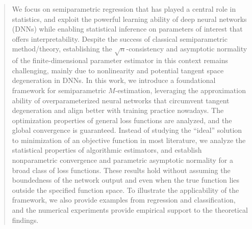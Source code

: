 \begin{abstract} 

We focus on semiparametric regression that has played a central role in statistics, and exploit the powerful learning ability of deep neural networks (DNNs) while enabling statistical inference on parameters of interest that offers interpretability. Despite the success of classical semiparametric method/theory, establishing the $\sqrt{n}$-consistency and asymptotic normality of the finite-dimensional parameter estimator in this context remains challenging, mainly due to nonlinearity and potential tangent space degeneration in DNNs. In this work, we introduce a foundational framework for semiparametric $M$-estimation, leveraging the approximation ability of overparameterized neural networks that circumvent tangent degeneration and align better with training practice nowadays. The optimization properties of general loss functions are analyzed, and the global convergence is guaranteed. Instead of studying the ``ideal'' solution to minimization of an objective function in most literature, we analyze the statistical properties of algorithmic estimators, and establish nonparametric convergence and parametric asymptotic normality for a broad class of loss functions. These results hold without assuming the boundedness of the network output and even when the true function lies outside the specified function space. 
To illustrate the applicability of the framework, we also provide examples from regression and classification, and the numerical experiments provide empirical support to the theoretical findings. 


\end{abstract}